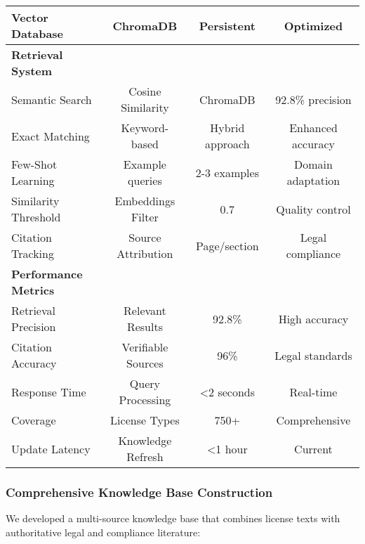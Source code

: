 \begin{table}[ht]
{\begin{tabular}{lccc}
\hspace{0.2cm} Vector Database & ChromaDB & Persistent & Optimized \\
\midrule
\textbf{Retrieval System} & & & \\
\hspace{0.2cm} Semantic Search & Cosine Similarity & ChromaDB & 92.8\% precision \\
\hspace{0.2cm} Exact Matching & Keyword-based & Hybrid approach & Enhanced accuracy \\
\hspace{0.2cm} Few-Shot Learning & Example queries & 2-3 examples & Domain adaptation \\
\hspace{0.2cm} Similarity Threshold & Embeddings Filter & 0.7 & Quality control \\
\hspace{0.2cm} Citation Tracking & Source Attribution & Page/section & Legal compliance \\
\midrule
\textbf{Performance Metrics} & & & \\
\hspace{0.2cm} Retrieval Precision & Relevant Results & 92.8\% & High accuracy \\
\hspace{0.2cm} Citation Accuracy & Verifiable Sources & 96\% & Legal standards \\
\hspace{0.2cm} Response Time & Query Processing & <2 seconds & Real-time \\
\hspace{0.2cm} Coverage & License Types & 750+ & Comprehensive \\
\hspace{0.2cm} Update Latency & Knowledge Refresh & <1 hour & Current \\
\bottomrule
\end{tabular}
}
\end{table}


\subsubsection{Comprehensive Knowledge Base Construction}
We developed a multi-source knowledge base that combines license texts with authoritative legal and compliance literature:

